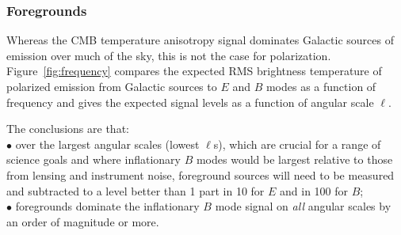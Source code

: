 \vspace{-0.18in}

\subsubsection{Foregrounds}
\label{sec:foregrounds}

\vspace{-0.05in}

Whereas the CMB temperature anisotropy signal dominates Galactic sources
of emission over much of the sky, this is not the case for polarization. 
Figure~\ref{fig:frequency} compares the expected RMS brightness temperature 
of polarized emission from Galactic sources to $E$ and $B$ modes
as a function of frequency and gives the expected signal levels as a function of angular scale $\ell$.  

\noindent The conclusions are that: \\
$\bullet$ \hspace{0.05in} over the largest angular scales (lowest $\ell$s), which are crucial for a range 
of science goals and where inflationary $B$ modes 
would be largest relative to those from lensing and instrument noise, foreground sources 
will need to be measured and subtracted to a level better than 1 part in 10 for $E$ and in 100 for $B$; \\
$\bullet$ \hspace{0.05in} foregrounds dominate the inflationary $B$ mode signal on {\it all} angular 
scales by an order of magnitude or more.

